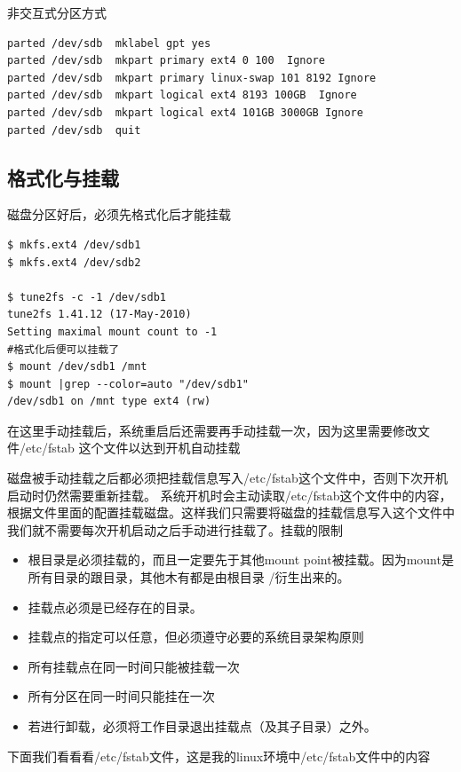 非交互式分区方式

\begin{lstlisting}
parted /dev/sdb  mklabel gpt yes
parted /dev/sdb  mkpart primary ext4 0 100  Ignore
parted /dev/sdb  mkpart primary linux-swap 101 8192 Ignore
parted /dev/sdb  mkpart logical ext4 8193 100GB  Ignore
parted /dev/sdb  mkpart logical ext4 101GB 3000GB Ignore
parted /dev/sdb  quit
\end{lstlisting}

\subsection{ 格式化与挂载}
磁盘分区好后，必须先格式化后才能挂载

\begin{lstlisting}
$ mkfs.ext4 /dev/sdb1
$ mkfs.ext4 /dev/sdb2

$ tune2fs -c -1 /dev/sdb1
tune2fs 1.41.12 (17-May-2010)
Setting maximal mount count to -1
#格式化后便可以挂载了
$ mount /dev/sdb1 /mnt
$ mount |grep --color=auto "/dev/sdb1"
/dev/sdb1 on /mnt type ext4 (rw)
\end{lstlisting}

在这里手动挂载后，系统重启后还需要再手动挂载一次，因为这里需要修改文件/etc/fstab 这个文件以达到开机自动挂载

磁盘被手动挂载之后都必须把挂载信息写入/etc/fstab这个文件中，否则下次开机启动时仍然需要重新挂载。 系统开机时会主动读取/etc/fstab这个文件中的内容，根据文件里面的配置挂载磁盘。这样我们只需要将磁盘的挂载信息写入这个文件中我们就不需要每次开机启动之后手动进行挂载了。挂载的限制
\begin{itemize}
\item  根目录是必须挂载的，而且一定要先于其他mount point被挂载。因为mount是所有目录的跟目录，其他木有都是由根目录 /衍生出来的。
\item  挂载点必须是已经存在的目录。
\item  挂载点的指定可以任意，但必须遵守必要的系统目录架构原则
\item  所有挂载点在同一时间只能被挂载一次
\item  所有分区在同一时间只能挂在一次
\item  若进行卸载，必须将工作目录退出挂载点（及其子目录）之外。
\end{itemize}

下面我们看看看/etc/fstab文件，这是我的linux环境中/etc/fstab文件中的内容

